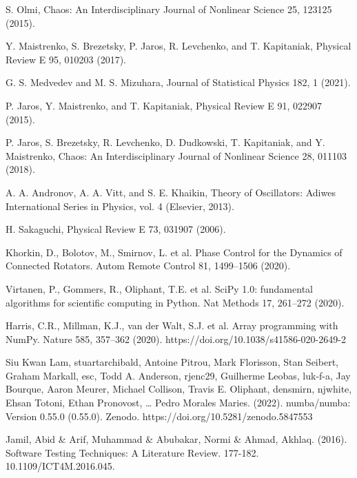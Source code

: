 \documentclass[a4paper,12pt, titlepage]{report} %
\theoremstyle{plain}
\begin{document}
\begin{thebibliography}{10}
    S. Olmi, Chaos: An Interdisciplinary Journal of Nonlinear Science 25, 123125 (2015).

    Y. Maistrenko, S. Brezetsky, P. Jaros, R. Levchenko, and T. Kapitaniak, Physical Review E 95, 010203 (2017).

    G. S. Medvedev and M. S. Mizuhara, Journal of Statistical Physics 182, 1 (2021).

    P. Jaros, Y. Maistrenko, and T. Kapitaniak, Physical Review E 91, 022907 (2015).

    P. Jaros, S. Brezetsky, R. Levchenko, D. Dudkowski, T. Kapitaniak, and Y. Maistrenko, Chaos: An Interdisciplinary Journal of Nonlinear Science 28, 011103 (2018).

    A. A. Andronov, A. A. Vitt, and S. E. Khaikin, Theory of Oscillators: Adiwes International Series in Physics, vol. 4 (Elsevier, 2013).

    H. Sakaguchi, Physical Review E 73, 031907 (2006).

    Khorkin, D., Bolotov, M., Smirnov, L. et al. Phase Control for the Dynamics of Connected Rotators. Autom Remote Control 81, 1499–1506 (2020).

    Virtanen, P., Gommers, R., Oliphant, T.E. et al. SciPy 1.0: fundamental algorithms for scientific computing in Python. Nat Methods 17, 261–272 (2020).

    Harris, C.R., Millman, K.J., van der Walt, S.J. et al. Array programming with NumPy. Nature 585, 357–362 (2020). https://doi.org/10.1038/s41586-020-2649-2

    Siu Kwan Lam, stuartarchibald, Antoine Pitrou, Mark Florisson, Stan Seibert, Graham Markall, esc, Todd A. Anderson, rjenc29, Guilherme Leobas, luk-f-a, Jay Bourque, Aaron Meurer, Michael Collison, Travis E. Oliphant, densmirn, njwhite, Ehsan Totoni, Ethan Pronovost, … Pedro Morales Maries. (2022). numba/numba: Version 0.55.0 (0.55.0). Zenodo. https://doi.org/10.5281/zenodo.5847553

    Jamil, Abid \& Arif, Muhammad \& Abubakar, Normi \& Ahmad, Akhlaq. (2016). Software Testing Techniques: A Literature Review. 177-182. 10.1109/ICT4M.2016.045.

  \end{thebibliography}
\end{document}
